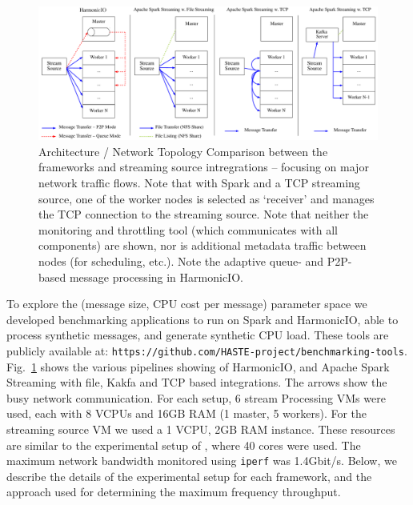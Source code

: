 \documentclass[conference]{IEEEtran}
\begin{document}
\begin{figure}[h]
\includegraphics[width=\textwidth]{images/arch-comp-w-kafka}
\caption{Architecture / Network Topology Comparison between the frameworks and streaming source intregrations -- focusing on major network traffic flows. Note that with Spark and a TCP streaming source, one of the worker nodes is selected as `receiver' and manages the TCP connection to the streaming source. 
Note that neither the monitoring and throttling tool (which communicates with all components) are shown, nor is additional metadata traffic between nodes (for scheduling, etc.). Note the adaptive queue- and P2P-based message processing in HarmonicIO.}
\label{fig:arch-comp}
\end{figure}


To explore the (message size, CPU cost per message) parameter space we developed benchmarking applications to run on Spark and HarmonicIO, able to process synthetic messages, and generate synthetic CPU load. These tools are publicly available at: \texttt{https://github.com/HASTE-project/benchmarking-tools}.
Fig.~\ref{fig:arch-comp} shows the various pipelines showing of HarmonicIO, and Apache Spark Streaming with file, Kakfa and TCP based integrations. The arrows show the busy network communication.
For each setup, 6 stream Processing VMs were used, each with 8 VCPUs and 16GB RAM (1 master, 5 workers). For the streaming source VM we used a 1 VCPU, 2GB RAM instance.  
These resources are similar to the experimental setup of \cite{xinApacheSparkFastest2014}, where 40 cores were used.
The maximum network bandwidth monitored using \texttt{iperf} was 1.4Gbit/s. 
Below, we describe the details of the experimental setup for each framework, and the approach used for determining the maximum frequency throughput.
\end{document}
